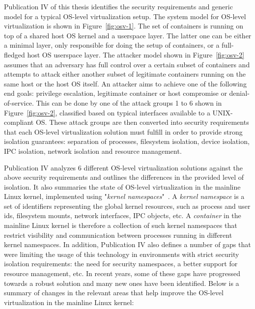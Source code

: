 Publication IV of this thesis identifies the security requirements and generic model for a typical OS-level virtualization setup.
The system model for OS-level virtualization is shown in Figure~\ref{fig:osv-1}. The set of containers  is running on top of a shared host OS kernel and a userspace layer. The latter one can be either a minimal layer, only responsible for doing the setup of containers, or a full-fledged host OS userspace layer. The attacker model shown in Figure~\ref{fig:osv-2} assumes that an adversary has full control over a certain subset of containers and attempts to attack either another subset of legitimate containers running on the same host or the host OS itself. An attacker aims to achieve one of the following end goals: privilege escalation, legitimate container or host compromise or denial-of-service. This can be done by one of the attack groups 1 to 6 shown in Figure~\ref{fig:osv-2}, classified based on typical interfaces available to a UNIX-compliant OS. These attack groups are then converted into security requirements that each OS-level virtualization solution must fulfill in order to provide strong isolation guarantees: separation of processes, filesystem isolation, device isolation, IPC isolation, network isolation and resource management.   

Publication IV analyzes 6 different OS-level virtualization solutions against the above security requirements and outlines the differences in the provided level of isolation. It also summaries the state of OS-level virtualization in the mainline Linux kernel, implemented using "\textit{kernel namespaces}"~\cite{biederman2006}. A \textit{kernel namespace} is a set of identifiers representing the global kernel resources, such as process and user ids, filesystem mounts, network interfaces, IPC objects, etc. A \textit{container} in the mainline Linux kernel is therefore a collection of such kernel namespaces that restrict visibility and communication between processes running in different kernel namespaces. In addition, Publication IV also defines a number of gaps that were limiting the usage of this technology in environments with strict security isolation requirements: the need for security namespaces, a better support for resource management, etc. In recent years, some of these gaps have progressed towards a robust solution and many new ones have been identified. Below is a summary of changes in the relevant areas that help improve the OS-level virtualization in the mainline Linux kernel:  

